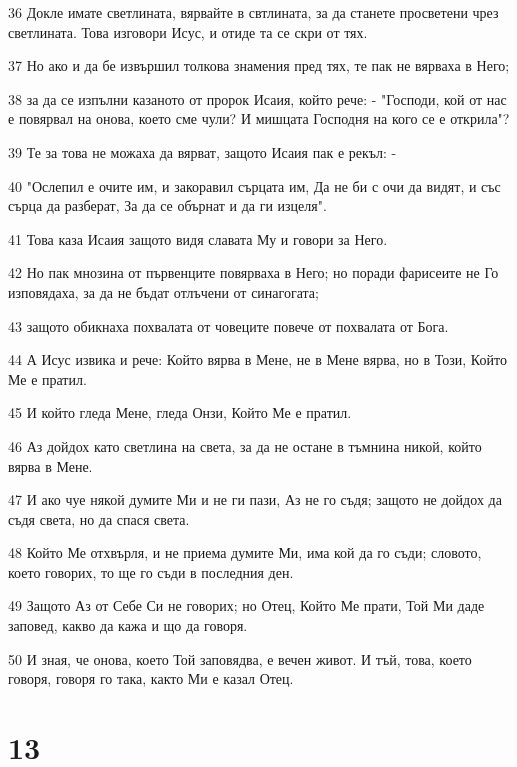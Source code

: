 \par 36 Докле имате светлината, вярвайте в свтлината, за да станете просветени чрез светлината. Това изговори Исус, и отиде та се скри от тях.
\par 37 Но ако и да бе извършил толкова знамения пред тях, те пак не вярваха в Него;
\par 38 за да се изпълни казаното от пророк Исаия, който рече: - "Господи, кой от нас е повярвал на онова, което сме чули? И мишцата Господня на кого се е открила"?
\par 39 Те за това не можаха да вярват, защото Исаия пак е рекъл: -
\par 40 "Ослепил е очите им, и закоравил сърцата им, Да не би с очи да видят, и със сърца да разберат, За да се обърнат и да ги изцеля".
\par 41 Това каза Исаия защото видя славата Му и говори за Него.
\par 42 Но пак мнозина от първенците повярваха в Него; но поради фарисеите не Го изповядаха, за да не бъдат отлъчени от синагогата;
\par 43 защото обикнаха похвалата от човеците повече от похвалата от Бога.
\par 44 А Исус извика и рече: Който вярва в Мене, не в Мене вярва, но в Този, Който Ме е пратил.
\par 45 И който гледа Мене, гледа Онзи, Който Ме е пратил.
\par 46 Аз дойдох като светлина на света, за да не остане в тъмнина никой, който вярва в Мене.
\par 47 И ако чуе някой думите Ми и не ги пази, Аз не го съдя; защото не дойдох да съдя света, но да спася света.
\par 48 Който Ме отхвърля, и не приема думите Ми, има кой да го съди; словото, което говорих, то ще го съди в последния ден.
\par 49 Защото Аз от Себе Си не говорих; но Отец, Който Ме прати, Той Ми даде заповед, какво да кажа и що да говоря.
\par 50 И зная, че онова, което Той заповядва, е вечен живот. И тъй, това, което говоря, говоря го така, както Ми е казал Отец.

\chapter{13}

